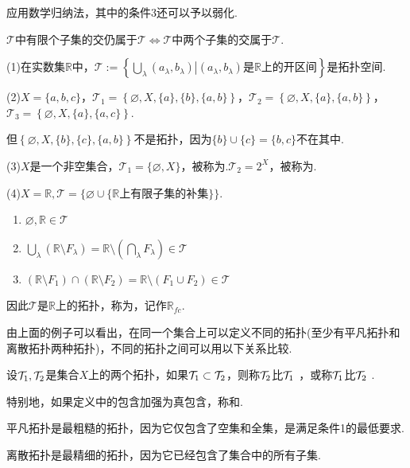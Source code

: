 应用数学归纳法，其中的条件3还可以予以弱化.
\begin{proposition}[条件3的等价条件][prop:2.2]
    $\mathcal{T}$中有限个子集的交仍属于$\mathcal{T} \Leftrightarrow \mathcal{T}$中两个子集的交属于$\mathcal{T}$.
\end{proposition}

\begin{instance}
    (1)在实数集$\mathbb{R}$中，$\mathcal{T}:=\left\{\bigcup_\lambda{(a_\lambda,b_\lambda)}\left|(a_\lambda,b_\lambda)\text{是}\mathbb{R}\text{上的开区间}\right.\right\}$是拓扑空间.\par
    (2)$X=\{a,b,c\}$，$\mathcal{T}_1 = \left\{\varnothing,X,\{a\},\{b\},\{a,b\}\right\}$，$\mathcal{T}_2 = \left\{\varnothing,X,\{a\},\{a,b\}\right\}$，$\mathcal{T}_3 = \left\{\varnothing,X,\{a\},\{a,c\}\right\}$.\par
    但$\left\{\varnothing,X,\{b\},\{c\},\{a,b\}\right\}$不是拓扑，因为$\{b\}\cup\{c\}=\{b,c\}$不在其中.\par
    (3)$X$是一个非空集合，$\mathcal{T}_1=\{\varnothing,X\}$，被称为.$\mathcal{T}_2=2^X$，被称为.\par
    (4)$X=\mathbb{R},\mathcal{T}=\{\varnothing\cup\{\mathbb{R}\text{上有限子集的补集}\}\}$.
    \begin{enumerate}[leftmargin=4.75em,label=(\roman*)]
        \item $\varnothing,\mathbb{R} \in \mathcal{T}$
        \item $\bigcup_{\lambda}{\left(\mathbb{R}\setminus F_\lambda\right)}=\mathbb{R}\setminus\left(\bigcap_{\lambda}{F_\lambda}\right) \in \mathcal{T}$
        \item $(\mathbb{R}\setminus F_1) \cap (\mathbb{R}\setminus F_2)=\mathbb{R}\setminus\left(F_1\cup F_2\right) \in \mathcal{T}$
    \end{enumerate}
    因此$\mathcal{T}$是$\mathbb{R}$上的拓扑，称为，记作$\mathbb{R}_{fc}$.
\end{instance}

由上面的例子可以看出，在同一个集合上可以定义不同的拓扑(至少有平凡拓扑和离散拓扑两种拓扑)，不同的拓扑之间可以用以下关系比较.

\begin{definition}[拓扑的精细与粗糙][def:2.2]
    设$\mathcal{T}_1,\mathcal{T}_2$是集合$X$上的两个拓扑，如果$\mathcal{T}_1\subset \mathcal{T}_2$，则称$\mathcal{T}_2$比$\mathcal{T}_1$ ，或称$\mathcal{T}_1$比$\mathcal{T}_2$ .
\end{definition}
特别地，如果定义中的包含加强为真包含，称和.
\begin{note}
    平凡拓扑是最粗糙的拓扑，因为它仅包含了空集和全集，是满足条件1的最低要求.\par
    离散拓扑是最精细的拓扑，因为它已经包含了集合中的所有子集.
\end{note}

